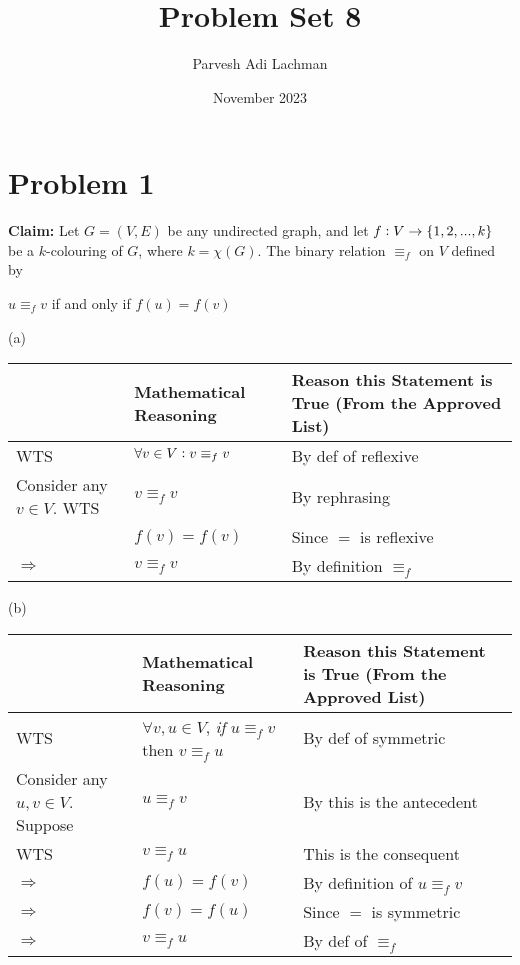 \documentclass{article}
\title{Problem Set 8}
\author{Parvesh Adi Lachman}
\date{November 2023}
\begin{document}
\maketitle

\section{Problem 1}
\noindent\textbf{Claim:} Let $G=(V,E)$ be any undirected graph, and let $f\vcentcolon V\rightarrow \{1,2,...,k\}$ be a $k$-colouring of $G$, where $k=\chi (G)$. The binary relation $\equiv_f$ on $V$ defined by
\begin{center}
	$u\equiv_f v$ if and only if $f(u)=f(v)$
\end{center}
\vspace{10pt}

(a)\vspace{5pt}

\begin{adjustwidth}{-1.5cm}{}
	\begin{tabular}{|p{1.5cm}|p{6.6cm}|p{5.5cm}|}
		\hline
        & \textbf{Mathematical Reasoning} & \textbf{Reason this Statement is True (From the Approved List)} \\
        \hline
		\vspace{1pt}
		WTS & $\forall v\in V\vcentcolon v\equiv_f v$ & By def of reflexive \\
		\hline
		Consider any $v\in V$. WTS & $v\equiv_f v$ & By rephrasing \\
		\hline
		 & $f(v)=f(v)$ & Since $=$ is reflexive \\
		\hline
		$\Rightarrow$ & $v\equiv_f v$ & By definition $\equiv_f$\\
		\hline		
	\end{tabular}
\end{adjustwidth}
\vspace{10pt}


(b) 
\vspace{5pt}

\begin{adjustwidth}{-1.5cm}{}
	\begin{tabular}{|p{1.5cm}|p{6.6cm}|p{5.5cm}|}
		\hline
        & \textbf{Mathematical Reasoning} & \textbf{Reason this Statement is True (From the Approved List)} \\
        \hline
		\vspace{1pt}
		WTS & $\forall v,u\in V$, \textit{if} $u\equiv_f v$ then $v\equiv_f u$  & By def of symmetric \\
		\hline
		Consider any $u,v\in V$. Suppose & $u\equiv_f v$ & By this is the antecedent \\
		\hline
		WTS & $v\equiv_f u$  & This is the consequent \\
		\hline
		$\Rightarrow$ & $f(u)=f(v)$ & By definition of $u\equiv_f v$ \\
		\hline
		$\Rightarrow$ & $f(v)=f(u)$ & Since $=$ is symmetric \\
		\hline
		$\Rightarrow$ & $v\equiv_f u$ & By def of $\equiv_f$ \\
		\hline
	\end{tabular}
\end{adjustwidth}
\vspace{10pt}
\end{document}
